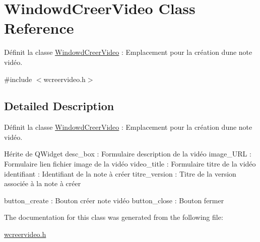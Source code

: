 \hypertarget{class_windowd_creer_video}{}\section{Windowd\+Creer\+Video Class Reference}
\label{class_windowd_creer_video}


Définit la classe \hyperlink{class_windowd_creer_video}{Windowd\+Creer\+Video} \+: Emplacement pour la création d\textquotesingle{}une note vidéo.  




{\ttfamily \#include $<$wcreervideo.\+h$>$}



\subsection{Detailed Description}
Définit la classe \hyperlink{class_windowd_creer_video}{Windowd\+Creer\+Video} \+: Emplacement pour la création d\textquotesingle{}une note vidéo. 

Hérite de Q\+Widget desc\+\_\+box \+: Formulaire description de la vidéo image\+\_\+\+U\+RL \+: Formulaire lien fichier image de la vidéo video\+\_\+title \+: Formulaire titre de la vidéo identifiant \+: Identifiant de la note à créer titre\+\_\+version \+: Titre de la version associée à la note à créer

button\+\_\+create \+: Bouton créer note vidéo button\+\_\+close \+: Bouton fermer 

The documentation for this class was generated from the following file\+:\begin{DoxyCompactItemize}
\item 
\hyperlink{wcreervideo_8h}{wcreervideo.\+h}\end{DoxyCompactItemize}
